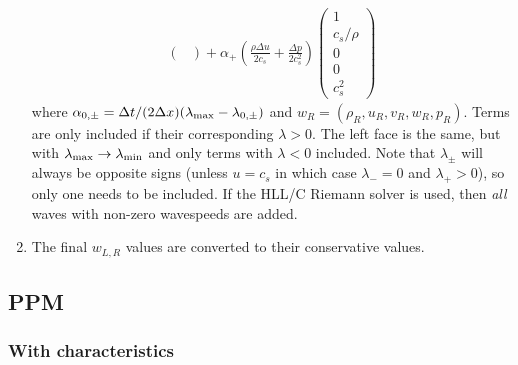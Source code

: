 \documentclass{article}
\begin{document}
\begin{enumerate}
\begin{align}
\begin{pmatrix}
 \end{pmatrix}
 +\alpha_+ \left( \frac{\rho \Delta u}{2 c_s} + \frac{\Delta p}{2 c_s^2} \right) 
 \begin{pmatrix}
  1 \\ c_s/\rho \\ 0 \\ 0 \\ c_s^2
 \end{pmatrix}
\end{align}
where $\alpha_{0,\pm} = \Delta t/(2 \Delta x) (\lambda_{\rm max} - \lambda_{0,\pm})$ and $w_R = (\rho_R, u_R, v_R, w_R, p_R)$.
Terms are only included if their corresponding $\lambda > 0$.
The left face is the same, but with $\lambda_{\rm max} \rightarrow \lambda_{\rm min}$ and only terms with $\lambda<0$ included. 
Note that $\lambda_\pm$ will always be opposite signs (unless $u=c_s$ in which case $\lambda_- =0$ and $\lambda_+ > 0$), so only one needs to be included. 
If the HLL/C Riemann solver is used, then \emph{all} waves with non-zero wavespeeds are added. 

\item The final $w_{L,R}$ values are converted to their conservative values.

\end{enumerate}




\subsection{PPM}

\subsubsection{With characteristics}
\end{document}
